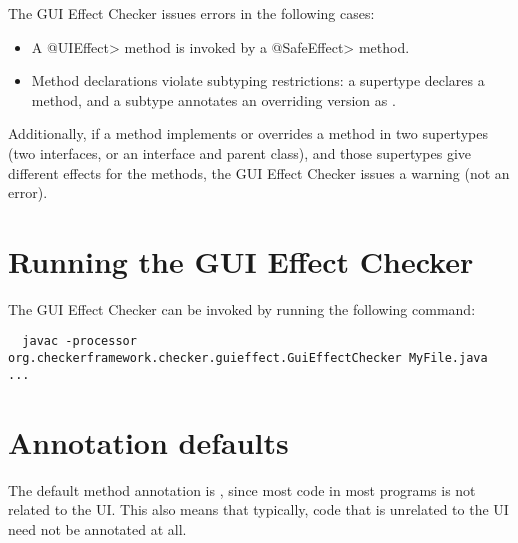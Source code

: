 The GUI Effect Checker issues errors in the following cases:


\begin{itemize}
\item
  A \<@UIEffect> method is invoked by a \<@SafeEffect> method.

\item
  Method declarations violate subtyping restrictions:  a supertype declares
  a  method, and a subtype annotates an overriding
  version as .

\end{itemize}

Additionally, if a method implements or overrides a method in two
supertypes (two interfaces, or an interface and parent class), and those
supertypes give different effects for the methods, the GUI Effect Checker
issues a warning (not an error).



%

\section{Running the GUI Effect Checker\label{guieffect-running}}

The GUI Effect Checker can be invoked by running the following command:
\begin{Verbatim}
  javac -processor org.checkerframework.checker.guieffect.GuiEffectChecker MyFile.java ...
\end{Verbatim}


\section{Annotation defaults\label{guieffect-defaults}}
The default method annotation is , since most code in most programs is not related
to the UI\@.  This also means that typically, code that is unrelated to the UI need not be annotated
at all.

